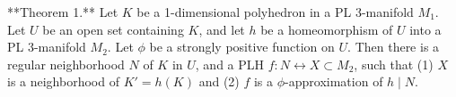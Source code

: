 **Theorem 1.** Let $K$ be a 1-dimensional polyhedron in a PL 3-manifold $M_1$. Let $U$ be an open set containing $K$, and let $h$ be a homeomorphism of $U$ into a PL 3-manifold $M_2$. Let $\phi$ be a strongly positive function on $U$. Then there is a regular neighborhood $N$ of $K$ in $U$, and a PLH $f: N \leftrightarrow X \subset M_2$, such that (1) $X$ is a neighborhood of $K' = h(K)$ and (2) $f$ is a $\phi$-approximation of $h \mid N$.
